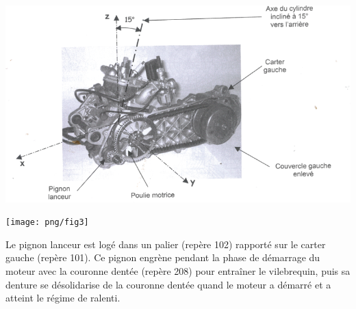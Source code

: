 \documentclass[11pt,oneside]{article}
\begin{document}
\begin{center}
\includegraphics[width=.75\textwidth]{png/fig1}
\end{center}

\begin{center}
\texttt{[image: png/fig3]}
\end{center}

\begin{center}
\end{center}




Le pignon lanceur est logé dans un palier (repère 102) rapporté sur le carter gauche (repère 101). Ce pignon engrène pendant la phase de démarrage du moteur avec la couronne dentée (repère 208) pour entraîner le vilebrequin, puis sa denture se désolidarise de la couronne dentée quand le moteur a démarré et a atteint le régime de ralenti. 
\end{document}
